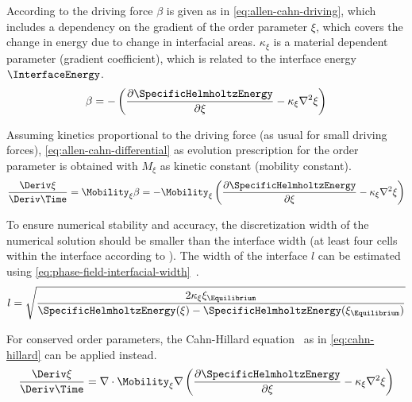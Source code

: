 According to \textcite{Allen1979} the driving force $\beta$ is given as in \cref{eq:allen-cahn-driving}, which includes a dependency on the gradient of the order parameter $\xi$, which covers the change in energy due to change in interfacial areas.
$\kappa_\xi$ is a material dependent parameter (gradient coefficient), which is related to the interface energy $\InterfaceEnergy$.
\begin{equation}
    \beta = - \left( \frac{\partial\SpecificHelmholtzEnergy}{\partial\xi} - \kappa_\xi \nabla^2 \xi \right)
    \label{eq:allen-cahn-driving}
\end{equation}

Assuming kinetics proportional to the driving force (as usual for small driving forces), \cref{eq:allen-cahn-differential} as evolution prescription for the order parameter is obtained with $M_\xi$ as kinetic constant (mobility constant).
\begin{equation}
    \frac{\Deriv\xi}{\Deriv\Time} = \Mobility_\xi \beta = -\Mobility_\xi \left( \frac{\partial\SpecificHelmholtzEnergy}{\partial\xi} - \kappa_\xi \nabla^2 \xi \right)
    \label{eq:allen-cahn-differential}
\end{equation}

To ensure numerical stability and accuracy, the discretization width of the numerical solution should be smaller than the interface width (at least four cells within the interface according to \textcite{Qin2010}).
The width of the interface $l$ can be estimated using \cref{eq:phase-field-interfacial-width}~\cite{Qin2010}.
\begin{equation}
    l = \sqrt{\frac{2\kappa_\xi \xi_\Equilibrium}{\SpecificHelmholtzEnergy(\xi) - \SpecificHelmholtzEnergy(\xi_\Equilibrium)}}
    \label{eq:phase-field-interfacial-width}
\end{equation}

For conserved order parameters, the Cahn-Hillard equation~\cite{Cahn1961} as in \cref{eq:cahn-hillard} can be applied instead.
\begin{equation}
    \frac{\Deriv\xi}{\Deriv\Time} = \nabla \cdot \Mobility_\xi \nabla \left( \frac{\partial\SpecificHelmholtzEnergy}{\partial\xi} - \kappa_\xi \nabla^2 \xi \right)
    \label{eq:cahn-hillard}
\end{equation}

